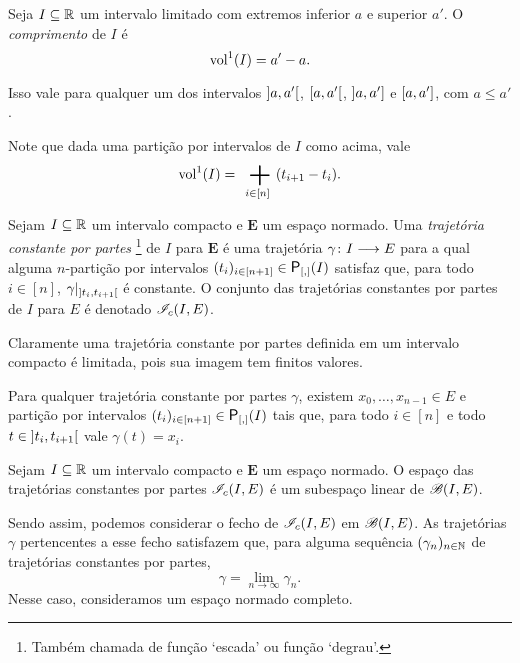 \begin{definition}
Seja $I \subseteq \mathbb{R}$ um intervalo limitado com extremos inferior $a$ e superior $a'$. O \emph{comprimento} de $I$ é
	\begin{equation*}
	\operatorname{vol}^1(I) = a'-a.
	\end{equation*}
\end{definition}

Isso vale para qualquer um dos intervalos $\left]a,\allowbreak a'\right[$, $\left[a,\allowbreak a'\right[$, $\left]a,\allowbreak a'\right]$ e $\left[a,\allowbreak a'\right]$, com $a \leq a'$.

Note que dada uma partição por intervalos de $I$ como acima, vale
	\begin{equation*}
	\vol^1(I) = \sum_{i \in [n]} (t_{i+1}-t_i).
	\end{equation*}

\begin{definition}
Sejam $I \subseteq \mathbb{R}$ um intervalo compacto e $\bm E$ um espaço normado. Uma \emph{trajetória constante por partes}%
	\footnote{Também chamada de função `escada' ou função `degrau'.}
de $I$ para $\bm E$ é uma trajetória $\gamma\colon \allowbreak I \longrightarrow E$ para a qual alguma $n$-partição por intervalos $(t_i)_{i \in [n+1]} \in \Partinter(I)$ satisfaz que, para todo $i \in [n]$, $\gamma|_{\left]t_i,\allowbreak t_{i+1}\right[}$ é constante.
O conjunto das trajetórias constantes por partes de $I$ para $E$ é denotado $\mathscr{I}_{c}(I,E)$.
\end{definition}

Claramente uma trajetória constante por partes definida em um intervalo compacto é limitada, pois sua imagem tem finitos valores.

Para qualquer trajetória constante por partes $\gamma$, existem $x_0, \ldots, x_{n-1} \in E$ e partição por intervalos $(t_i)_{i \in [n+1]} \in \Partinter(I)$ tais que, para todo $i \in [n]$ e todo $t \in \left]t_i,\allowbreak t_{i+1}\right[$ vale $\gamma(t) = x_i$.

\begin{exercise}
Sejam $I \subseteq \mathbb{R}$ um intervalo compacto e $\bm E$ um espaço normado. O espaço das trajetórias constantes por partes $\mathscr{I}_{c}(I,E)$ é um subespaço linear de $\mathscr{B}(I,E)$.
\end{exercise}

Sendo assim, podemos considerar o fecho de $\mathscr{I}_{c}(I,E)$ em $\mathscr{B}(I,E)$. As trajetórias $\gamma$ pertencentes a esse fecho satisfazem que, para alguma sequência $(\gamma_n)_{n \in \mathbb{N}}$ de trajetórias constantes por partes,
	\begin{equation*}
	\gamma = \lim_{n \to \infty} \gamma_n.
	\end{equation*}
Nesse caso, consideramos um espaço normado completo.

